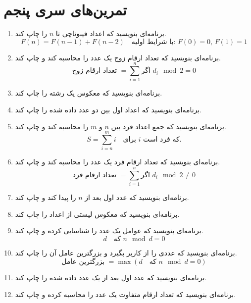 \documentclass[b5paper,12pt]{article}
\begin{document}
	\newpage
	\section*{تمرین‌های سری پنجم}
	\begin{enumerate}
		
		
		\item برنامه‌ای بنویسید که اعداد فیبوناچی تا \(n\) را چاپ کند. 
		\[
		F(n) = F(n-1) + F(n-2) \quad \text{با شرایط اولیه: } F(0) = 0, \, F(1) = 1
		\]
		
		\item برنامه‌ای بنویسید که تعداد ارقام زوج یک عدد را محاسبه کند و چاپ کند.
		\[
		\text{تعداد ارقام زوج } = \sum_{i=1}^{n} \text{اگر } d_i \mod 2 = 0
		\]
		
		\item برنامه‌ای بنویسید که معکوس یک رشته را چاپ کند.
		
		\item برنامه‌ای بنویسید که اعداد اول بین دو عدد داده شده را چاپ کند.
		
		\item برنامه‌ای بنویسید که جمع اعداد فرد بین \(n\) و \(m\) را محاسبه کند و چاپ کند.
		\[
		S = \sum_{i=n}^{m} i \quad \text{برای } i \text{ که فرد است.}
		\]
		
		\item برنامه‌ای بنویسید که تعداد ارقام فرد یک عدد را محاسبه کند و چاپ کند.
		\[
		\text{تعداد ارقام فرد } = \sum_{i=1}^{n} \text{اگر } d_i \mod 2 \neq 0
		\]
		
		\item برنامه‌ای بنویسید که عدد اول بعد از \(n\) را پیدا کند و چاپ کند.
		
		\item برنامه‌ای بنویسید که معکوس لیستی از اعداد را چاپ کند.
		
		\item برنامه‌ای بنویسید که عوامل یک عدد را شناسایی کرده و چاپ کند.
		\[
		d \quad \text{که } n \mod d = 0
		\]
		
		\item برنامه‌ای بنویسید که عددی را از کاربر بگیرد و بزرگترین عامل آن را چاپ کند.
		\[
		\text{بزرگترین عامل } = \max(d \quad \text{که } n \mod d = 0)
		\]
		
		\item برنامه‌ای بنویسید که عدد اول بعد از یک عدد داده شده را چاپ کند.
		
		\item برنامه‌ای بنویسید که تعداد ارقام متفاوت یک عدد را محاسبه کرده و چاپ کند.
		

\end{enumerate}
\end{document}
